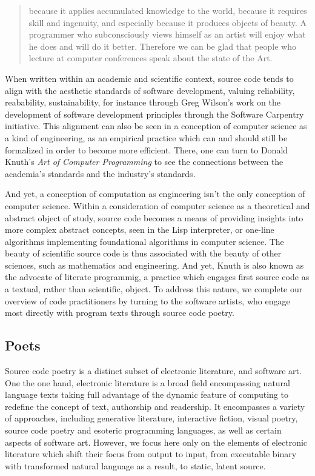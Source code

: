 \begin{quote}
  because it applies accumulated knowledge to the world, because it requires skill and ingenuity, and especially because it produces objects of beauty. A programmer who subconsciously views himself as an artist will enjoy what he does and will do it better. Therefore we can be glad that people who lecture at computer conferences speak about the state of the Art. \citep{knuth_computer_1974}
\end{quote}

When written within an academic and scientific context, source code tends to align with the aesthetic standards of software development, valuing reliability, reabability, sustainability, for instance through Greg Wilson's work on the development of software development principles through the Software Carpentry initiative. This alignment can also be seen in a conception of computer science as a kind of engineering, as an empirical practice which can and should still be formalized in order to become more efficient. There, one can turn to Donald Knuth's \emph{Art of Computer Programming} to see the connections between the academia's standards and the industry's standards.

And yet, a conception of computation as engineering isn't the only conception of computer science. Within a consideration of computer science as a  theoretical and abstract object of study, source code becomes a means of providing insights into more complex abstract concepts, seen in the Lisp interpreter, or one-line algorithms implementing foundational algorithms in computer science. The beauty of scientific source code is thus associated with the beauty of other sciences, such as mathematics and engineering. And yet, Knuth is also known as the advocate of literate programmig, a practice which engages first source code as a textual, rather than scientific, object. To address this nature, we complete our overview of code practitioners by turning to the software artists, who engage most directly with program texts through source code poetry.

\subsection{Poets}
\label{subsec:poets}


Source code poetry is a distinct subset of electronic literature, and software art. One the one hand, electronic literature is a broad field encompassing natural language texts taking full advantage of the dynamic feature of computing to redefine the concept of text, authorship and readership. It encompasses a variety of approaches, including generative literature, interactive fiction, visual poetry, source code poetry and esoteric programming languages, as well as certain aspects of software art. However, we focus here only on the elements of electronic literature which shift their focus from output to input, from executable binary with transformed natural language as a result, to static, latent source.

